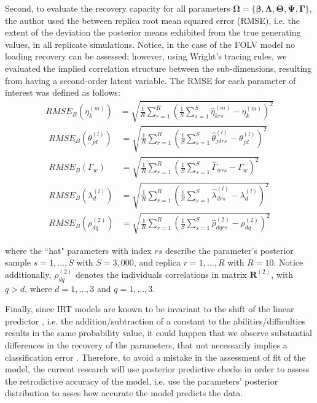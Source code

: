 Second, to evaluate the recovery capacity for all parameters $\pmb{\Omega} = \{ \pmb{\beta}, \pmb{\Lambda}, \pmb{\Theta}, \pmb{\Psi}, \pmb{\Gamma} \}$, the author used the between replica root mean squared error (RMSE), i.e. the extent of the deviation the posterior means exhibited from the true generating values, in all replicate simulations. Notice, in the case of the FOLV model no loading recovery can be assessed; however, using Wright's tracing rules, we evaluated the implied correlation structure between the sub-dimensions, resulting from having a second-order latent variable. The RMSE for each parameter of interest was defined as follows:
%
\begin{align}
	RMSE_{B} \left( \eta^{(m)}_{k} \right) &=\sqrt{\frac{1}{R} \sum_{r=1}^{R} \left( \frac{1}{S} \sum_{s=1}^{S} \hat{\eta}^{(m)}_{krs} - \eta^{(m)}_{k} \right)^2}
\end{align}
%
\begin{align}
	RMSE_{B} \left( \theta^{(l)}_{jd} \right) &=\sqrt{\frac{1}{R} \sum_{r=1}^{R} \left( \frac{1}{S} \sum_{s=1}^{S} \hat{\theta}^{(l)}_{jdrs} - \theta^{(l)}_{jd} \right)^2} \\
	RMSE_{B} \left( \Gamma_{w} \right) &=\sqrt{\frac{1}{R} \sum_{r=1}^{R} \left( \frac{1}{S} \sum_{s=1}^{S} \hat{\Gamma}_{wrs} - \Gamma_{w} \right)^2} \\
	RMSE_{B} \left( \lambda^{(l)}_{d} \right) &=\sqrt{\frac{1}{R} \sum_{r=1}^{R} \left( \frac{1}{S} \sum_{s=1}^{S} \hat{\lambda}^{(l)}_{drs} - \lambda^{(l)}_{d} \right)^2} \\
	RMSE_{B} \left( \rho^{(2)}_{dq} \right) &=\sqrt{\frac{1}{R} \sum_{r=1}^{R} \left( \frac{1}{S} \sum_{s=1}^{S} \hat{\rho}^{(2)}_{dqrs} - \rho^{(2)}_{dq} \right)^2}
\end{align}

\noindent where the ``hat" parameters with index $rs$ describe the parameter's posterior sample $s=1, \dots, S$ with $S=3,000$, and replica $r=1, \dots, R$ with $R=10$. Notice additionally, $\rho^{(2)}_{dq}$ denotes the individuals correlations in matrix $\boldsymbol{R}^{(2)}$, with $q>d$, where $d=1,\dots,3$ and $q=1,\dots,3$.

Finally, since IRT models are known to be invariant to the shift of the linear predictor \cite{Baker_et_al_1992, Bock_1972}, i.e. the addition/subtraction of a constant to the abilities/difficulties results in the same probability value, it could happen that we observe substantial differences in the recovery of the parameters, that not necessarily implies a classification error  \cite{Wollack_2002}. Therefore, to avoid a mistake in the assessment of fit of the model, the current research will use posterior predictive checks in order to assess the retrodictive accuracy of the model, i.e. use the parameters' posterior distribution to asses how accurate the model predicts the data.

